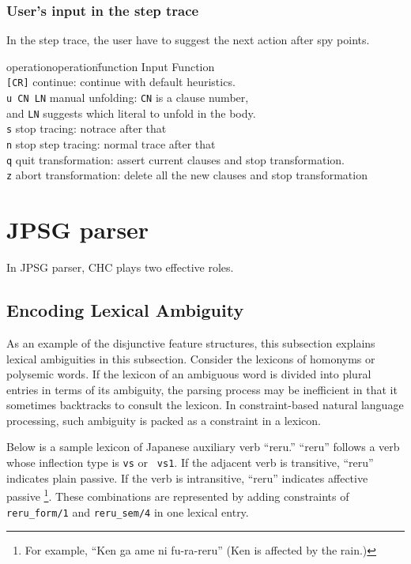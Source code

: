 \subsubsection{User's input in the step trace}
In the step trace, the user have to suggest the next action 
after spy points.
\begin{tabbing}
operationoperation\=function \kill
Input \> Function\\
{\tt [CR]} \> continue: continue with default heuristics.\\
{\tt u CN LN} \>manual unfolding: {\tt CN} is a clause number, \\
	\> and {\tt LN} suggests which literal to unfold in the body.\\
{\tt s} \> stop tracing: notrace after that\\
{\tt n} \> stop step tracing: normal trace after that\\
{\tt q} \> quit transformation: assert current clauses and stop
transformation.\\
{\tt z} \> abort transformation: delete all the new clauses and stop
transformation\\
\end{tabbing}

\section{JPSG parser}
In JPSG parser, CHC plays two effective roles.

\subsection{Encoding Lexical Ambiguity}
As an example of the disjunctive feature structures, this subsection 
explains lexical
ambiguities in this subsection.
Consider the lexicons of homonyms or polysemic words.
If the lexicon of an ambiguous word 
is divided into plural entries in terms of its
ambiguity, the parsing process may be inefficient in that it  
sometimes backtracks to consult the lexicon.
In constraint-based natural language processing, such ambiguity is
packed as a constraint in a lexicon.

Below is a sample lexicon of Japanese auxiliary verb ``reru.''
``reru'' follows a verb whose inflection type is {\tt vs} or {\tt
vs1}.
If the adjacent verb is transitive, ``reru'' indicates plain passive.
If the verb is intransitive, ``reru'' indicates affective passive
\footnote{For example, ``Ken ga ame ni fu-ra-reru'' (Ken is affected
by the rain.)
}.
These combinations are represented by adding constraints of  
{\tt reru\_form/1} and {\tt reru\_sem/4} in one lexical entry.

